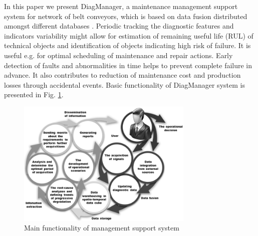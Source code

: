 In this paper we present DiagManager, a maintenance management support system for network of belt conveyors, which is based on data fusion distributed amongst different databases \cite{StefaniakZimroz2014,Stefaniak2012}. Periodic tracking the diagnostic features and indicators variability might allow for estimation of remaining useful life (RUL) of technical objects and identification of objects indicating high risk of failure. It is useful e.g. for optimal scheduling of maintenance and repair actions. Early detection of faults and abnormalities in time helps to prevent complete failure in advance. It also contributes to reduction of maintenance cost and production losses through accidental events. Basic functionality of DiagManager system is presented in Fig. \ref{fig: f2}.
\begin{figure}[ht!]
\centering
\includegraphics[width = 0.75\textwidth]{Wykresy/Fig_2}
\caption{Main functionality of management support system}
\label{fig: f2}
\end{figure}
